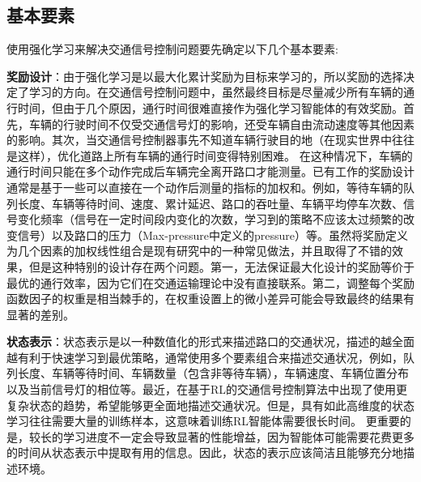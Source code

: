 



\subsection{基本要素}
使用强化学习来解决交通信号控制问题要先确定以下几个基本要素:

\textbf{奖励设计}：由于强化学习是以最大化累计奖励为目标来学习的，所以奖励的选择决定了学习的方向。在交通信号控制问题中，虽然最终目标是尽量减少所有车辆的通行时间，但由于几个原因，通行时间很难直接作为强化学习智能体的有效奖励。首先，车辆的行驶时间不仅受交通信号灯的影响，还受车辆自由流动速度等其他因素的影响。其次，当交通信号控制器事先不知道车辆行驶目的地（在现实世界中往往是这样），优化道路上所有车辆的通行时间变得特别困难。 在这种情况下，车辆的通行时间只能在多个动作完成后车辆完全离开路口才能测量。已有工作的奖励设计通常是基于一些可以直接在一个动作后测量的指标的加权和。例如，等待车辆的队列长度、车辆等待时间、速度、累计延迟、路口的吞吐量、车辆平均停车次数、信号变化频率（信号在一定时间段内变化的次数，学习到的策略不应该太过频繁的改变信号）以及路口的压力（Max-pressure中定义的pressure）等。虽然将奖励定义为几个因素的加权线性组合是现有研究中的一种常见做法，并且取得了不错的效果，但是这种特别的设计存在两个问题。第一，无法保证最大化设计的奖励等价于最优的通行效率，因为它们在交通运输理论中没有直接联系。第二，调整每个奖励函数因子的权重是相当棘手的，在权重设置上的微小差异可能会导致最终的结果有显著的差别。

\textbf{状态表示}：状态表示是以一种数值化的形式来描述路口的交通状况，描述的越全面越有利于快速学习到最优策略，通常使用多个要素组合来描述交通状况，例如，队列长度、车辆等待时间、车辆数量（包含非等待车辆），车辆速度、车辆位置分布以及当前信号灯的相位等。最近，在基于RL的交通信号控制算法中出现了使用更复杂状态的趋势，希望能够更全面地描述交通状况。但是，具有如此高维度的状态学习往往需要大量的训练样本，这意味着训练RL智能体需要很长时间。 更重要的是，较长的学习进度不一定会导致显著的性能增益，因为智能体可能需要花费更多的时间从状态表示中提取有用的信息。因此，状态的表示应该简洁且能够充分地描述环境。

